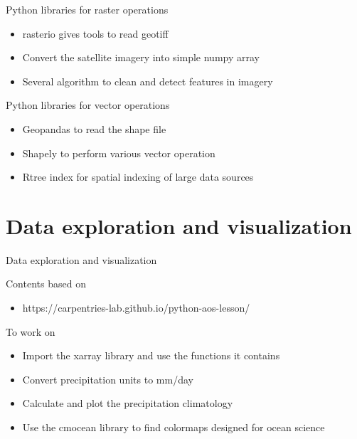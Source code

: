 \begin{frame}{Python libraries for raster operations}
	\begin{beamerboxesrounded}{}
		\begin{itemize}
			\item rasterio gives tools to read geotiff
			\item Convert the satellite imagery into simple numpy array
			\item Several algorithm to clean and detect features in imagery
		\end{itemize}
	\end{beamerboxesrounded}
\end{frame}


\begin{frame}{Python libraries for vector operations}
	\begin{beamerboxesrounded}{}
		\begin{itemize}
			\item Geopandas to read the shape file
			\item Shapely to perform various vector operation
			\item Rtree index for spatial indexing of large data sources
		\end{itemize}
	\end{beamerboxesrounded}
\end{frame}

\section[Data exploration and visualization ]{Data exploration and visualization}

\begin{frame}{Data exploration and visualization}
	\begin{beamerboxesrounded}{Contents based on }
		\begin{itemize}
			\item https://carpentries-lab.github.io/python-aos-lesson/
		\end{itemize}
	\end{beamerboxesrounded}
	\begin{beamerboxesrounded}{To work on}
		\begin{itemize}
			\item Import the xarray library and use the functions it contains
			\item Convert precipitation units to mm/day
			\item Calculate and plot the precipitation climatology
			\item Use the cmocean library to find colormaps designed for ocean science
		\end{itemize}
	\end{beamerboxesrounded}
\end{frame}


